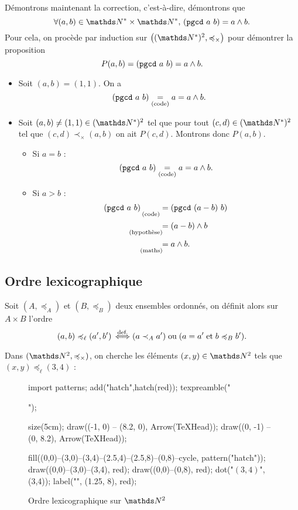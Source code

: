 Démontrons maintenant la correction, c'est-à-dire, démontrons que \[
	\forall (a,b) \in \N^*\times\N^*,\,({\tt pgcd}\ a\ b) = a \wedge b
.\]
Pour cela, on procède par induction sur $\big((\N^*)^2, {\preceq_\times}\big)$ pour démontrer la proposition \[
	P(a,b) = ({\tt pgcd}\ a\ b) = a \wedge b
.\] 
\begin{itemize}
	\item Soit $(a,b) = (1, 1)$. On a \[
				({\tt pgcd}\ a\ b) \underset{\text{(code)}}= a = a \wedge b
			.\]
		\item Soit $(a,b) \neq (1,1) \in (\N^*)^2$\/ tel que pour tout $(c,d) \in (\N^*)^2$\/ tel que $(c,d) \prec_\times (a,b) $\/ on ait $P(c,d)$.
			Montrons donc $P(a,b)$.
			\begin{itemize}
				\item Si $a = b$\/ : \[
						({\tt pgcd}\ a\ b) \underset{\text{(code)}}= a = a \wedge b
					.\]
				\item Si $a > b$\/ :
					\begin{align*}
						({\tt pgcd}\ a\ b) \mathop{}_{\text{(code)}}&= ({\tt pgcd}\ (a-b)\ b)\\
						\mathop{}_{\text{(hypothèse)}}\!\!&= (a-b) \wedge b\\
						\mathop{}_{\text{(maths)}}\!\!&= a \wedge b.
					\end{align*}
			\end{itemize}
\end{itemize}

\subsection{Ordre lexicographique}

\begin{defn}
	Soit $(A, \preceq_A)$\/ et $(B, \preceq_B)$\/ deux ensembles ordonnés, on définit alors sur $A\times B$\/ l'ordre \[
		(a,b) \preccurlyeq_{\ell} (a',b') \mathop{\iff}^{\text{def.}} (a \prec_A a') \mathrel{\text{ou}} (a = a' \mathrel{\text{et}} b \preccurlyeq_B b')
	.\]
\end{defn}

\begin{exm}
	Dans $(\N^2, \preceq_\times)$, on cherche les éléments $(x,y) \in \N^2$\/ tels que $(x,y) \preceq_\ell (3, 4)$\/ :
	\begin{figure}[H]
		\centering
		\begin{asy}
			import patterns;
			add("hatch",hatch(red));
			texpreamble("\usepackage[outline]{contour}");

			size(5cm);
			draw((-1, 0) -- (8.2, 0), Arrow(TeXHead));
			draw((0, -1) -- (0, 8.2), Arrow(TeXHead));

			fill((0,0)--(3,0)--(3,4)--(2.5,4)--(2.5,8)--(0,8)--cycle, pattern("hatch"));
			draw((0,0)--(3,0)--(3,4), red);
			draw((0,0)--(0,8), red);
			dot("$(3,4)$", (3,4));
			label("\large{}", (1.25, 8), red);
		\end{asy}
		\caption{Ordre lexicographique sur $\N^2$\/}
	\end{figure}
\end{exm}

